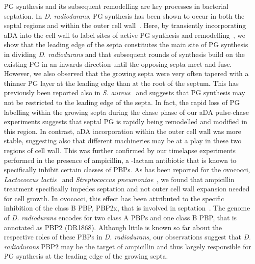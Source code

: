 PG synthesis and its subsequent remodelling are key processes in bacterial septation.
In \textit{D. radiodurans}, PG synthesis has been shown to occur in both the septal regions and within the outer cell wall~\cite{flochCellMorphologyNucleoid2019}.
Here, by transiently incorporating aDA into the cell wall to label sites of active PG synthesis and remodelling~\cite{trouveNanoscaleDynamicsPeptidoglycan2021,lundMolecularCoordinationStaphylococcus2018}, we show that the leading edge of the septa constitutes the main site of PG synthesis in dividing \textit{D. radiodurans} and that subsequent rounds of synthesis build on the existing PG in an inwards direction until the opposing septa meet and fuse.
However, we also observed that the growing septa were very often tapered with a thinner PG layer at the leading edge than at the root of the septum.
This has previously been reported also in \textit{S. aureus}~\cite{giesbrechtStaphylococcalCellWall1998,matiasCryoelectronMicroscopyCell2007,lundMolecularCoordinationStaphylococcus2018} and suggests that PG synthesis may not be restricted to the leading edge of the septa.
In fact, the rapid loss of PG labelling within the growing septa during the chase phase of our aDA pulse-chase experiments suggests that septal PG is rapidly being remodelled and modified in this region.
In contrast, aDA incorporation within the outer cell wall was more stable, suggesting also that different machineries may be at a play in these two regions of cell wall.
This was further confirmed by our timelapse experiments performed in the presence of ampicillin, a \beta-lactam antibiotic that is known to specifically inhibit certain classes of PBPs.
As has been reported for the ovococci, \textit{Lactococcus lactis}~\cite{perez-nunezNewMorphogenesisPathway2011} and \textit{Streptococcus pneumoniae}~\cite{landRequirementEssentialPbp2x2013,kocaogluProfilingVlactamSelectivity2015}, we found that ampicillin treatment specifically impedes septation and not outer cell wall expansion needed for cell growth.
In ovococci, this effect has been attributed to the specific inhibition of the class B PBP, PBP2x, that is involved in septation~\cite{perez-nunezNewMorphogenesisPathway2011,landRequirementEssentialPbp2x2013,zapunPenicillinbindingProteinsBetalactam2008}.
The genome of \textit{D. radiodurans} encodes for two class A PBPs and one class B PBP, that is annotated as PBP2 (DR1868).
Although little is known so far about the respective roles of these PBPs in \textit{D. radiodurans}, our observations suggest that \textit{D. radiodurans} PBP2 may be the target of ampicillin and thus largely responsible for PG synthesis at the leading edge of the growing septa.

